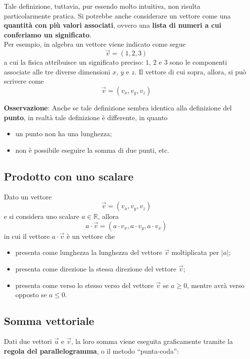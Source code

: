 \documentclass[a4paper]{extarticle}
\newcommand{\quotes}[1]{``#1''}
\begin{document}
\vspace{1em}
\noindent
Tale definizione, tuttavia, pur essendo molto intuitiva, non risulta particolarmente pratica. Si potrebbe anche considerare un vettore come una \textbf{quantità con più valori associati}, ovvero una \textbf{lista di numeri a cui conferiamo un significato}.\\
Per esempio, in algebra un vettore viene indicato come segue
\[\vec{v} = (1, 2, 3)\]
a cui la fisica attribuisce un significato preciso: $1$, $2$ e $3$ sono le componenti associate alle tre diverse dimensioni $x$, $y$ e $z$. Il vettore di cui sopra, allora, si può scrivere come
\[\vec{v} = (v_x, v_y, v_z)\]

\vspace{1em}
\noindent
\textbf{Osservazione}: Anche se tale definizione sembra identica alla definizione del \textbf{punto}, in realtà tale definizione è differente, in quanto
\begin{itemize}
  \item un punto non ha una lunghezza;
  \item non è possibile eseguire la somma di due punti, etc.
\end{itemize}

\vspace{1em}
\subsection{Prodotto con uno scalare}
Dato un vettore
\[\vec{v} = \left(v_x, v_y, v_z\right)\]
e si considera uno scalare $a \in \mathbb{R}$, allora
\[a \cdot \vec{v} = \left(a \cdot v_x, a \cdot v_y, a \cdot v_x\right)\]
in cui il vettore $a \cdot \vec{v}$ è un vettore che
\begin{itemize}
  \item presenta come lunghezza la lunghezza del vettore $\vec{v}$ moltiplicata per $\vert a \vert$;
  \item presenta come direzione la stessa direzione del vettore $\vec{v}$;
  \item presenta come verso lo stesso verso del vettore $\vec{v}$ se $a \geq 0$, mentre avrà verso opposto se $a \leq 0$.
\end{itemize}

\vspace{1em}
\subsection{Somma vettoriale}
Dati due vettori $\vec{u}$ e $\vec{v}$, la loro somma viene eseguita graficamente tramite la \textbf{regola del parallelogramma}, o il metodo \quotes{punta-coda}:
\end{document}
